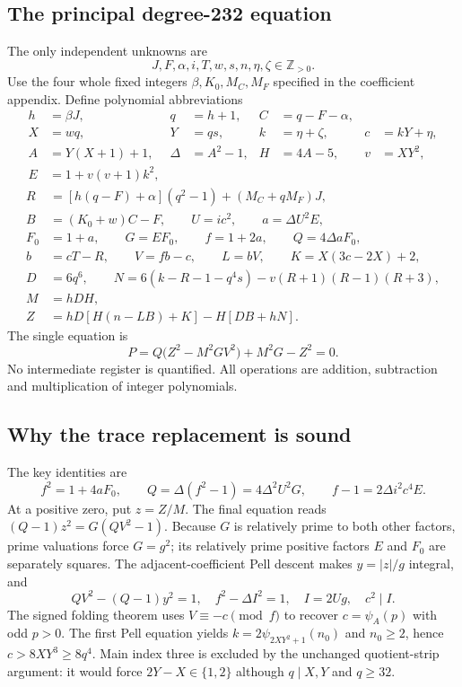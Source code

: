 \subsection{The principal degree-232 equation}
The only independent unknowns are
\[
 J,F,\alpha,i,T,w,s,n,\eta,\zeta\in\mathbb Z_{>0}.
\]
Use the four whole fixed integers $\beta,K_0,M_C,M_F$ specified in the
coefficient appendix. Define polynomial abbreviations
\begin{align*}
 h&=\beta J,&q&=h+1,& C&=q-F-\alpha,\\
 X&=wq,&Y&=qs,&k&=\eta+\zeta,&c&=kY+\eta,\\
 A&=Y(X+1)+1,&\Delta&=A^2-1,&H&=4A-5,&v&=XY^2,\\
 E&=1+v(v+1)k^2,&&&&&
\end{align*}
\begin{align*}
 R&=[h(q-F)+\alpha](q^2-1)+(M_C+qM_F)J,\\
 B&=(K_0+w)C-F,\qquad U=ic^2,\qquad a=\Delta U^2E,\\
 F_0&=1+a,\qquad G=EF_0,\qquad f=1+2a,\qquad Q=4\Delta aF_0,\\
 b&=cT-R,\qquad V=fb-c,\qquad L=bV,\qquad K=X(3c-2X)+2,\\
 D&=6q^6,\qquad
 N=6(k-R-1-q^4s)-v(R+1)(R-1)(R+3),\\
 M&=hDH,\\
 Z&=hD[H(n-LB)+K]-H[DB+hN].
\end{align*}
The single equation is
\begin{equation}
 \boxed{\ P=Q\bigl(Z^2-M^2GV^2\bigr)+M^2G-Z^2=0.\ }
 \label{eq:trace232}
\end{equation}
No intermediate register is quantified. All operations are addition,
subtraction and multiplication of integer polynomials.

\subsection{Why the trace replacement is sound}
The key identities are
\[
 f^2=1+4aF_0,\qquad
 Q=\Delta(f^2-1)=4\Delta^2U^2G,\qquad
 f-1=2\Delta i^2c^4E.
\]
At a positive zero, put $z=Z/M$. The final equation reads
$(Q-1)z^2=G(QV^2-1)$. Because $G$ is relatively prime to both other
factors, prime valuations force $G=g^2$; its relatively prime positive
factors $E$ and $F_0$ are separately squares. The adjacent-coefficient
Pell descent makes $y=|z|/g$ integral, and
\[
 QV^2-(Q-1)y^2=1,\quad
 f^2-\Delta I^2=1,\quad I=2Ug,\quad c^2\mid I.
\]
The signed folding theorem uses $V\equiv-c\pmod f$ to recover
$c=\psi_A(p)$ with odd $p>0$. The first Pell equation yields
$k=2\psi_{2XY^2+1}(n_0)$ and $n_0\ge2$, hence
$c>8XY^3\ge8q^4$. Main index three is excluded by the unchanged
quotient-strip argument: it would force $2Y-X\in\{1,2\}$ although
$q\mid X,Y$ and $q\ge32$.

